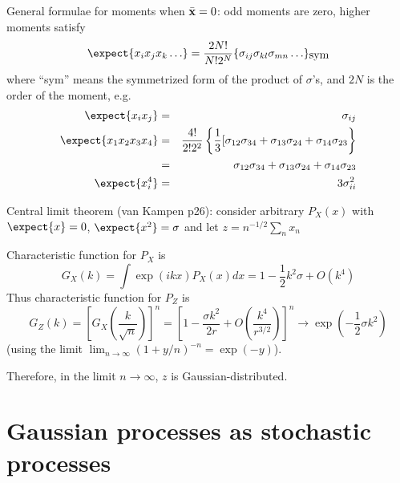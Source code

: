 \documentclass{beamer}
\begin{document}
\begin{frame}{}

   General formulae for moments when $\bar{\bf x}=0$: odd moments are zero, higher moments satisfy
\[
\expect{x_i x_j x_k \ldots} = \frac{2N!}{N! 2^N} \{ \sigma_{ij} \sigma_{kl} \sigma_{mn} \ldots \}_{\mbox{sym}}
\]
where ``sym'' means the symmetrized form of the product of $\sigma$'s, and $2N$ is the order of the moment, e.g.
\begin{eqnarray*}
\expect{x_i x_j} & = & \sigma_{ij} \\
\expect{x_1 x_2 x_3 x_4} & = & \frac{4!}{2! 2^2} \left\{ \frac{1}{3} [\sigma_{12}\sigma_{34} + \sigma_{13}\sigma_{24} + \sigma_{14}\sigma_{23}\right\} \\
& = & \sigma_{12}\sigma_{34} + \sigma_{13}\sigma_{24} + \sigma_{14}\sigma_{23} \\
\expect{x_i^4} & = & 3 \sigma^2_{ii}
\end{eqnarray*}


\end{frame}


\begin{frame}{}
Central limit theorem (van Kampen p26):
consider arbitrary $P_X(x)$ with $\expect{x} = 0$, $\expect{x^2} = \sigma$
and let $z = n^{-1/2} \sum_n x_n$

Characteristic function for $P_X$ is
\[
G_X(k) = \int \exp(ikx) P_X(x) dx = 1 - \frac{1}{2} k^2 \sigma + O(k^4)
\]
Thus characteristic function for $P_Z$ is
\[
G_Z(k) = \left[ G_X \left( \frac{k}{\sqrt{n}} \right) \right]^n
 = \left[ 1 - \frac{\sigma k^2}{2r} + O \left( \frac{k^4}{r^{3/2}} \right) \right]^n
 \to \exp(-\frac{1}{2} \sigma k^2)
\]
(using the limit $\lim_{n \to \infty} (1+y/n)^{-n} = \exp(-y)$).

Therefore, in the limit $n \to \infty$, $z$ is Gaussian-distributed.

\end{frame}


\section{Gaussian processes as stochastic processes}
\end{document}
